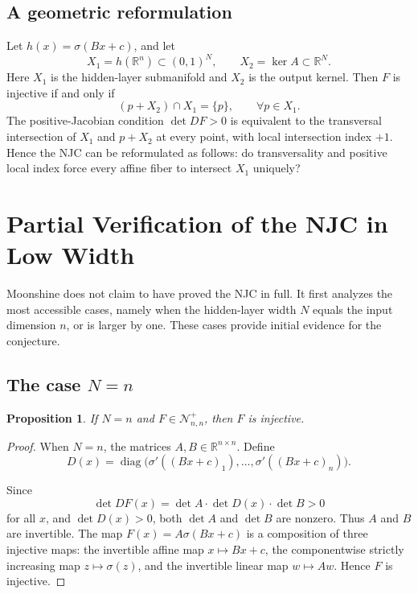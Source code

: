 \documentclass[a4paper,11pt]{article}
\theoremstyle{plain}
\newtheorem{proposition}[theorem]{Proposition}
\theoremstyle{definition}
\theoremstyle{remark}
\DeclareMathOperator{\diag}{diag}
\begin{document}
\subsection{A geometric reformulation}

Let \(h(x)=\sigma(Bx+c)\), and let
\[
X_1=h(\mathbb R^n)\subset (0,1)^N,\qquad X_2=\ker A\subset\mathbb R^N.
\]
Here \(X_1\) is the hidden-layer submanifold and \(X_2\) is the output kernel. Then \(F\) is injective if and only if
\[
(p+X_2)\cap X_1=\{p\},\qquad \forall p\in X_1.
\]
The positive-Jacobian condition \(\det DF>0\) is equivalent to the transversal intersection of \(X_1\) and \(p+X_2\) at every point, with local intersection index \(+1\). Hence the NJC can be reformulated as follows: do transversality and positive local index force every affine fiber to intersect \(X_1\) uniquely?

\section{Partial Verification of the NJC in Low Width}

Moonshine does not claim to have proved the NJC in full. It first analyzes the most accessible cases, namely when the hidden-layer width \(N\) equals the input dimension \(n\), or is larger by one. These cases provide initial evidence for the conjecture.

\subsection{The case \texorpdfstring{\(N=n\)}{N=n}}

\begin{proposition}
If \(N=n\) and \(F\in\mathcal N_{n,n}^+\), then \(F\) is injective.
\end{proposition}

\begin{proof}
When \(N=n\), the matrices \(A,B\in\mathbb R^{n\times n}\). Define
\[
D(x)=\diag\bigl(\sigma'((Bx+c)_1),\ldots,\sigma'((Bx+c)_{n})\bigr).
\]

Since
\[
\det DF(x)=\det A\cdot \det D(x)\cdot \det B>0
\]
for all \(x\), and \(\det D(x)>0\), both \(\det A\) and \(\det B\) are nonzero. Thus \(A\) and \(B\) are invertible. The map \(F(x)=A\sigma(Bx+c)\) is a composition of three injective maps: the invertible affine map \(x\mapsto Bx+c\), the componentwise strictly increasing map \(z\mapsto \sigma(z)\), and the invertible linear map \(w\mapsto Aw\). Hence \(F\) is injective.
\end{proof}
\end{document}
